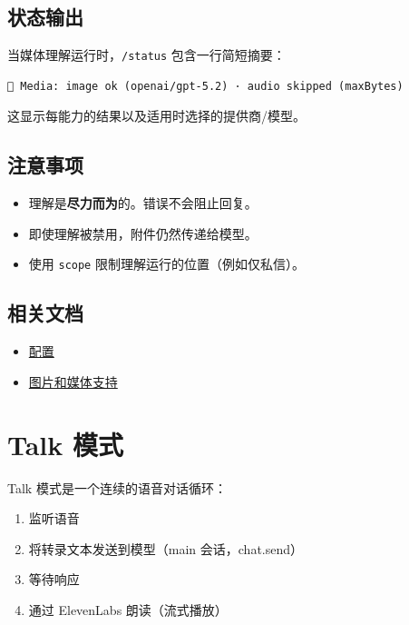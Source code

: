 \subsection{状态输出}


当媒体理解运行时，\texttt{/status} 包含一行简短摘要：

\begin{lstlisting}
📎 Media: image ok (openai/gpt-5.2) · audio skipped (maxBytes)
\end{lstlisting}


这显示每能力的结果以及适用时选择的提供商/模型。

\subsection{注意事项}


\begin{itemize}
  \item 理解是\textbf{尽力而为}的。错误不会阻止回复。
  \item 即使理解被禁用，附件仍然传递给模型。
  \item 使用 \texttt{scope} 限制理解运行的位置（例如仅私信）。
\end{itemize}


\subsection{相关文档}


\begin{itemize}
  \item \href{/gateway/configuration}{配置}
  \item \href{/nodes/images}{图片和媒体支持}
\end{itemize}



\clearpage

\section{Talk 模式}


Talk 模式是一个连续的语音对话循环：

\begin{enumerate}
  \item 监听语音
  \item 将转录文本发送到模型（main 会话，chat.send）
  \item 等待响应
  \item 通过 ElevenLabs 朗读（流式播放）
\end{enumerate}


